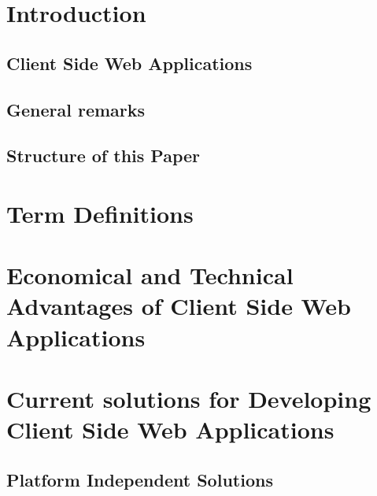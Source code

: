 

\tableofcontents
\newpage

\listoffigures
\newpage
\listoftables
\newpage

\chapter{Introduction}
 
  
 
 \section{Client Side Web Applications}

  

 \section{General remarks}
 
  
  
 \section{Structure of this Paper}
 
  
  
\chapter{Term Definitions}

\chapter{Economical and Technical Advantages of Client Side Web Applications}
 \label{sec:advantages}
 
 
\chapter{Current solutions for Developing Client Side Web Applications}
 \label{sec:currentSolutionsCSWA}
 

 \section{Platform Independent Solutions}
  
  
   
